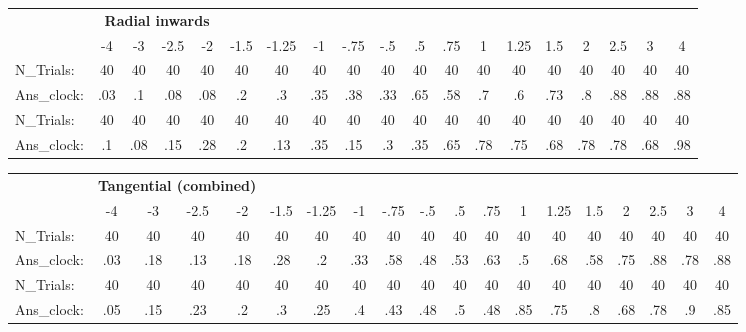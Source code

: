 \documentclass[11pt]{article} %
\begin{document}
\begin{table}[htb]
  \label{tbl:stats-and-correlations}
  \small\begin{tabular*}{\linewidth}{l@{\extracolsep{\fill}}*{18}{c}}
    \toprule
    & \multicolumn{4}{c}{\textbf{Radial inwards}}\\ \cmidrule(r){2-18}
    & {-4} & {-3} & {-2.5} & {-2} & {-1.5} & {-1.25} & {-1} & {-.75} & {-.5} & {.5} & {.75} & {1} & {1.25} & {1.5} & {2} & {2.5}& {3}& {4} \\ [0.5ex]
    N\_Trials:  &    40 &    40 &    40 &    40 &    40 &    40 &    40&   40 &   40 &    40&    40&    40&   40&    40&    40 & 40 & 40 & 40\\
    Ans\_clock:  &  .03 &  .1 &    .08 &    .08 &    .2 &    .3 &    .35 &   .38 &    .33&    .65&    .58&    .7&    .6&    .73&    .8&    .88& .88 & .88\\
    N\_Trials:  &    40 &    40 &    40 &    40 &    40 &    40 &    40&   40 &   40 &    40&    40&    40&   40&    40&    40 & 40 & 40 & 40\\
    Ans\_clock:  &  .1 &  .08 &    .15 &    .28 &    .2 &    .13 &    .35 &   .15 &    .3&    .35&    .65&    .78&    .75&    .68&    .78&    .78& .68 & .98\\
    \bottomrule
  \end{tabular*}
\end{table}


\begin{table}[htb]
  \label{tbl:stats-and-correlations}
  \small\begin{tabular*}{\linewidth}{l@{\extracolsep{\fill}}*{18}{c}}
    \toprule
    & \multicolumn{4}{c}{\textbf{Tangential (combined)}}\\ \cmidrule(r){2-18}
    & {-4} & {-3} & {-2.5} & {-2} & {-1.5} & {-1.25} & {-1} & {-.75} & {-.5} & {.5} & {.75} & {1} & {1.25} & {1.5} & {2} & {2.5}& {3}& {4} \\ [0.5ex]
    N\_Trials:  &    40 &    40 &    40 &  40 &  40 &    40 &    40&   40 &   40 &    40&    40&    40&   40&    40&    40 & 40 & 40 & 40\\
    Ans\_clock:  &  .03 &  .18 &    .13 & .18 &  .28 &    .2 &    .33 &   .58 &    .48&    .53&    .63&    .5&    .68&    .58&    .75&   .88 & .78 & .88\\
    N\_Trials:  &    40 &    40 &    40 &  40 &  40 &    40 &    40&   40 &   40 &    40&    40&    40&   40&    40&    40 & 40 & 40 & 40\\
    Ans\_clock:  &  .05 &  .15 &    .23 & .2 &  .3 &    .25 &    .4 &   .43 &    .48&    .5&    .48&    .85&    .75&    .8&    .68&   .78 & .9 & .85\\
    \bottomrule
  \end{tabular*}
\end{table}
\end{document}
